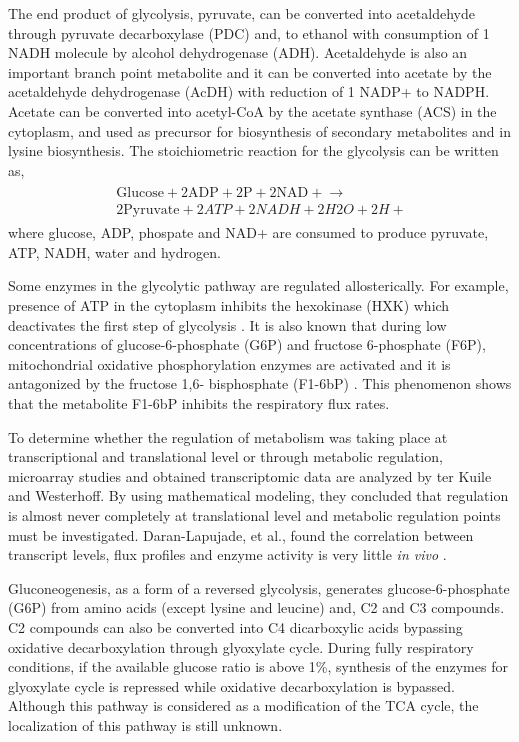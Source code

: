  \vspace{-0.5cm}

The end product of glycolysis, pyruvate, can be converted into acetaldehyde through pyruvate decarboxylase (PDC) and, to ethanol with consumption of 1 NADH molecule by alcohol dehydrogenase (ADH). Acetaldehyde is also an important branch point metabolite and it can be converted into acetate by the acetaldehyde dehydrogenase (AcDH) with reduction of 1 NADP+ to NADPH. Acetate can be converted into acetyl-CoA by the acetate synthase (ACS) in the cytoplasm, and used as precursor for biosynthesis of secondary metabolites and in lysine biosynthesis. The stoichiometric reaction for the glycolysis can be written as,
\begin{align}
  \begin{split}
    \ \text{Glucose} + 2 \text{ADP} + 2 \text{P} + 2 \text{NAD}+ \xrightarrow{} \\
    \ 2 \text{Pyruvate} + 2 {ATP} + 2 {NADH} + 2 H2O + 2{H}+
  \end{split}
\end{align}
where glucose, ADP, phospate and NAD+ are consumed to produce pyruvate, ATP, NADH, water and hydrogen.

Some enzymes in the glycolytic pathway are regulated allosterically. For example, presence of ATP in the cytoplasm inhibits the hexokinase (HXK) which deactivates the first step of glycolysis \cite{larsson2000importance}. It is also known that during low concentrations of glucose-6-phosphate (G6P) and fructose 6-phosphate (F6P), mitochondrial oxidative phosphorylation enzymes are activated and it is antagonized by the fructose 1,6- bisphosphate (F1-6bP) \cite{diaz2008mitochondrial}. This phenomenon shows that the metabolite F1-6bP inhibits the respiratory flux rates.

To determine whether the regulation of metabolism was taking place at transcriptional and translational level or through metabolic regulation, microarray studies and obtained transcriptomic data are analyzed by ter Kuile and Westerhoff\cite{ter2001transcriptome}. By using mathematical modeling, they concluded that regulation is almost never completely at translational level and metabolic regulation points must be investigated. Daran-Lapujade, et al., found the correlation between transcript levels, flux profiles and enzyme activity is very little \emph{in vivo} \cite{daran2004role}.

Gluconeogenesis, as a form of a reversed glycolysis, generates glucose-6-phosphate (G6P) from amino acids (except lysine and leucine) and, C2 and C3 compounds. C2 compounds can also be converted into C4 dicarboxylic acids bypassing oxidative decarboxylation through glyoxylate cycle. During fully respiratory conditions, if the available glucose ratio is above 1\%, synthesis of the enzymes for glyoxylate cycle is repressed while oxidative decarboxylation is bypassed. Although this pathway is considered as a modification of the TCA cycle, the localization of this pathway is still unknown.

